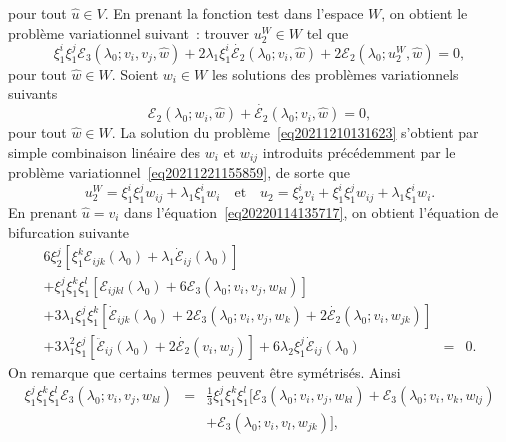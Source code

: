 \documentclass[12pt, final]{amsart}
\begin{document}
pour tout $\hat{u} \in V$. En prenant la fonction test dans l'espace $W$, on
obtient le problème variationnel suivant~: trouver $u_2^W \in W$ tel que
\begin{equation}
  \label{eq20211210131623} \xi_1^i \xi_1^j \mathcal{E}_3 (\lambda_0 ; v_i,
  v_j, \hat{w}) + 2 \lambda_1 \xi_1^i  \dot{\mathcal{E}_2} (\lambda_0 ; v_i,
  \hat{w}) + 2\mathcal{E}_2 (\lambda_0 ; u_2^W, \hat{w}) = 0,
\end{equation}
pour tout $\hat{w} \in W$. Soient $w_i \in W$ les solutions des problèmes
variationnels suivants
\begin{equation}
  \label{eq20220208143055} \mathcal{E}_2 (\lambda_0 ; w_i, \hat{w}) +
  \dot{\mathcal{E}_2} (\lambda_0 ; v_i, \hat{w}) = 0,
\end{equation}
pour tout $\hat{w} \in W$. La solution du
problème~\eqref{eq20211210131623} s'obtient par simple combinaison
linéaire des $w_i$ et $w_{ij}$ introduits précédemment par le
problème variationnel~\eqref{eq20211221155859}, de sorte que
\begin{equation}
  \label{eq20220124135324} u_2^W = \xi_1^i \xi_1^j w_{i  j} +
  \lambda_1 \xi_1^i w_i \quad \text{et} \quad u_2 = \xi_2^i v_i + \xi_1^i
  \xi_1^j w_{i  j} + \lambda_1 \xi_1^i w_i .
\end{equation}
En prenant $\hat{u} = v_i$ dans l'équation~\eqref{eq20220114135717}, on
obtient l'équation de bifurcation suivante
\begin{eqnarray}
  6 \xi_2^j  [\xi_1^k \mathcal{E}_{i  j  k} (\lambda_0) +
  \lambda_1  \dot{\mathcal{E}}_{i  j} (\lambda_0)] &  &  \nonumber\\
  + \xi_1^j \xi_1^k \xi_1^l  [\mathcal{E}_{i  j  k  l}
  (\lambda_0) + 6\mathcal{E}_3 (\lambda_0 ; v_i, v_j, w_{k  l})] &  &
  \nonumber\\
  + 3 \lambda_1 \xi_1^j \xi_1^k  [\dot{\mathcal{E}}_{i  j  k}
  (\lambda_0) + 2\mathcal{E}_3 (\lambda_0 ; v_i, v_j, w_k) + 2
  \dot{\mathcal{E}_2} (\lambda_0 ; v_i, w_{j  k})] &  &  \nonumber\\
  + 3 \lambda_1^2 \xi_1^j  [\ddot{\mathcal{E}}_{i  j} (\lambda_0) + 2
  \dot{\mathcal{E}_2} (v_i, w_j)] + 6 \lambda_2 \xi_1^j  \dot{\mathcal{E}}_{i
   j} (\lambda_0) & = & 0.  \label{eq20220210143805}
\end{eqnarray}
On remarque que certains termes peuvent {\^e}tre symétrisés. Ainsi
\begin{eqnarray}
  \xi_1^j \xi_1^k \xi_1^l \mathcal{E}_3 (\lambda_0 ; v_i, v_j, w_{k
  l}) & = & \tfrac{1}{3} \xi_1^j \xi_1^k \xi_1^l  [\mathcal{E}_3 (\lambda_0 ;
  v_i, v_j, w_{k  l})  +\mathcal{E}_3 (\lambda_0 ; v_i, v_k,
  w_{l  j}) \nonumber\\
  &  &   +\mathcal{E}_3 (\lambda_0 ; v_i, v_l, w_{j
   k})],
\end{eqnarray}
\end{document}
